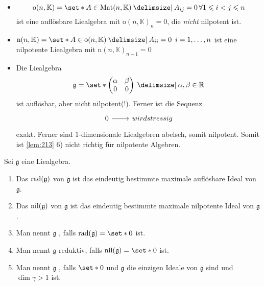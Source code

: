 \begin{beispiel*}
	\begin{itemize}
		\item \[
			\mathrm{o}(n,\mathbb{K}) = \set*{A \in \Mat(n,\mathbb{K}) \given A_{ij}=0 \, \forall 1 \le i<j \le n}
		\]
		ist eine auflösbare Liealgebra mit $\mathrm{o}(n,\mathbb{K})_n =0$, die \emph{nicht} nilpotent ist.
		\item $\mathrm{n}(n,\mathbb{K}) = \set*{A \in \mathrm{o}(n,\mathbb{K}) \given A_{ii}=0 \enspace i=1, \ldots ,n}$ ist eine nilpotente Liealgebra mit $\mathrm{n}(n,\mathbb{K})_{n-1}=0$
		\item Die Liealgebra 
		\[
			\mathfrak{g} = \set*{\begin{pmatrix}
				\alpha & \beta \\ 0 & 0
			\end{pmatrix} \given \alpha, \beta \in \mathbb{R}}
		\]
		ist auflösbar, aber nicht nilpotent(!).
		Ferner ist die Sequenz
		\[
			\begin{tikzcd}
				0 \rar & wird stressig
			\end{tikzcd}
		\]
		exakt.
		Ferner sind $1$-dimensionale Liealgebren abelsch, somit nilpotent.
		Somit ist \autoref{lem:213} 6) nicht richtig für nilpotente Algebren.
	\end{itemize}
\end{beispiel*}

\begin{definition}
	Sei $\mathfrak{g}$ eine Liealgebra.
	\begin{enumerate}[1),itemsep=0pt]
		\item Das  $\operatorname{rad} (\mathfrak{g})$ von $\mathfrak{g}$ ist das eindeutig bestimmte maximale auflösbare Ideal von $\mathfrak{g}$.
		\item Das  $\operatorname{nil} (\mathfrak{g})$ von $\mathfrak{g}$ ist das eindeutig bestimmte maximale nilpotente Ideal von $\mathfrak{g}$.
		\item Man nennt $\mathfrak{g}$ , falls $\rad(\mathfrak{g}) = \set*{0}$ ist.
		\item Man nennt $\mathfrak{g}$ reduktiv, falls $\nil(\mathfrak{g})= \set*{0}$ ist.
		\item Man nennt $\mathfrak{g}$ , falls $\set*{0}$ und $\mathfrak{g}$ die einzigen Ideale von $\mathfrak{g}$ sind und $\dim \gamma > 1$ ist.
	\end{enumerate}
\end{definition}

